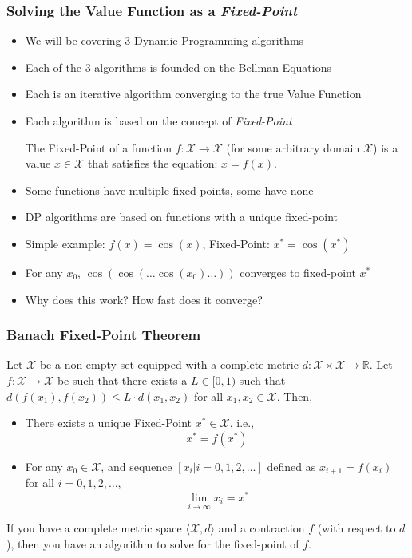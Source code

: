 \documentclass[handout]{beamer}
\begin{document}
\begin{frame}
\frametitle{Solving the Value Function as a {\em Fixed-Point}}
\pause
\begin{itemize}[<+->]
\item We will be covering 3 Dynamic Programming algorithms
\item Each of the 3 algorithms is founded on the Bellman Equations
\item Each is an iterative algorithm converging to the true Value Function
\item Each algorithm is based on the concept of {\em Fixed-Point}
\begin{definition}
The Fixed-Point of a function $f: \mathcal{X} \rightarrow \mathcal{X}$ (for some arbitrary domain $\mathcal{X}$) is a value $x \in \mathcal{X}$ that satisfies the equation: $x = f(x)$.
\end{definition}
\item Some functions have multiple fixed-points, some have none
\item DP algorithms are based on functions with a unique fixed-point
\item Simple example: $f(x) = \cos(x)$, Fixed-Point:  $x^* = \cos(x^*)$
\item For any $x_0$, $\cos(\cos(\ldots \cos(x_0) \ldots))$ converges to fixed-point $x^*$
\item Why does this work? How fast does it converge? 
\end{itemize}
\end{frame}

\begin{frame}
\frametitle{Banach Fixed-Point Theorem}
\pause
\begin{theorem}
Let $\mathcal{X}$ be a non-empty set equipped with a complete metric $d: \mathcal{X} \times \mathcal{X} \rightarrow \mathbb{R}$. Let $f: \mathcal{X} \rightarrow \mathcal{X}$ be such that there exists a $L \in [0, 1)$ such that
$d(f(x_1), f(x_2)) \leq L \cdot d(x_1, x_2)$ for all $x_1, x_2 \in \mathcal{X}$. Then,
\pause
\begin{itemize}[<+->]
\item There exists a unique Fixed-Point $x^* \in \mathcal{X}$, i.e.,
$$x^* = f(x^*)$$
\item For any $x_0 \in \mathcal{X}$, and sequence $[x_i|i=0, 1, 2, \ldots]$ defined as $x_{i+1} = f(x_i)$ for all $i = 0, 1, 2, \ldots$,
$$\lim_{i\rightarrow \infty} x_i = x^*$$
\end{itemize}
\end{theorem}
\pause
If you have a complete metric space $\langle \mathcal{X}, d \rangle$ and a contraction $f$ (with respect to $d$), then you have an algorithm to solve for the fixed-point of $f$.
\end{frame}
\end{document}
